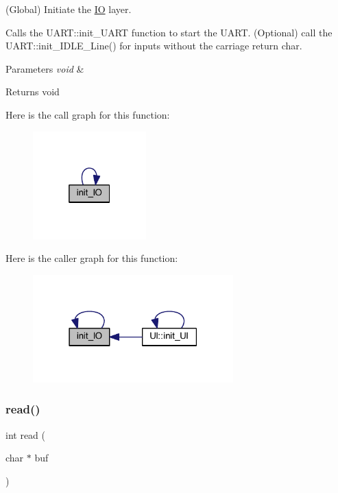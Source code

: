 (Global) Initiate the \mbox{\hyperlink{namespace_i_o}{IO}} layer. 

Calls the U\+A\+R\+T\+::init\+\_\+\+U\+A\+RT function to start the U\+A\+RT. (Optional) call the U\+A\+R\+T\+::init\+\_\+\+I\+D\+L\+E\+\_\+\+Line() for inputs without the carriage return char.


\begin{DoxyParams}{Parameters}
{\em void} & \\
\hline
\end{DoxyParams}
\begin{DoxyReturn}{Returns}
void 
\end{DoxyReturn}
Here is the call graph for this function\+:\nopagebreak
\begin{figure}[H]
\begin{center}
\leavevmode
\includegraphics[width=124pt]{namespace_i_o_a83055f0dd9e551c9e898a69d48530663_cgraph}
\end{center}
\end{figure}
Here is the caller graph for this function\+:\nopagebreak
\begin{figure}[H]
\begin{center}
\leavevmode
\includegraphics[width=219pt]{namespace_i_o_a83055f0dd9e551c9e898a69d48530663_icgraph}
\end{center}
\end{figure}
\mbox{\label{namespace_i_o_a1087fba97ca797e5ca155228ff9eec55}} 
\subsubsection{\texorpdfstring{read()}{read()}}
{\footnotesize\ttfamily int read (\begin{DoxyParamCaption}\item[{char $\ast$}]{buf }\end{DoxyParamCaption})}



